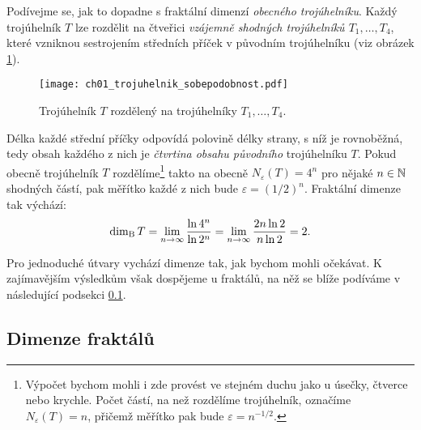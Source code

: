 \begin{example}\label{ex:fraktalni-dimenze-trojuhelnik}
    Podívejme se, jak to dopadne s fraktální dimenzí \emph{obecného trojúhelníku}. Každý trojúhelník $T$ lze rozdělit na čtveřici \emph{vzájemně shodných trojúhelníků $T_1,\dots,T_4$}, které vzniknou sestrojením středních příček v původním trojúhelníku (viz obrázek \ref{fig:trojuhelnik-sobepodobnost}).
    \begin{figure}[h]
        \centering
        \texttt{[image: ch01\_trojuhelnik\_sobepodobnost.pdf]}
        \caption{Trojúhelník $T$ rozdělený na trojúhelníky $T_1,\dots,T_4$.}
        \label{fig:trojuhelnik-sobepodobnost}
    \end{figure}
    Délka každé střední příčky odpovídá polovině délky strany, s níž je rovnoběžná, tedy obsah každého z nich je \emph{čtvrtina obsahu původního} trojúhelníku $T$. Pokud obecně trojúhelník $T$ rozdělíme\footnote{Výpočet bychom mohli i zde provést ve stejném duchu jako u úsečky, čtverce nebo krychle. Počet částí, na než rozdělíme trojúhelník, označíme $N_\varepsilon(T)=n$, přičemž měřítko pak bude $\varepsilon=n^{-1/2}$.} takto na obecně $N_\varepsilon(T)=4^n$ pro nějaké $n\in\mathbb{N}$ shodných částí, pak měřítko každé z nich bude $\varepsilon=(1/2)^n$. Fraktální dimenze tak výchází:
    \[\operatorname{dim_B}{T}=\lim_{n\to\infty}{\dfrac{\ln{4^n}}{\ln{2^n}}}=\lim_{n\to\infty}{\dfrac{2n\ln{2}}{n\ln{2}}}=2.\]
\end{example}
Pro jednoduché útvary vychází dimenze tak, jak bychom mohli očekávat. K zajímavějším výsledkům však dospějeme u fraktálů, na něž se blíže podíváme v následující podsekci \ref{subsec:dimenze-fraktalu}.

\subsection{Dimenze fraktálů}\label{subsec:dimenze-fraktalu}

